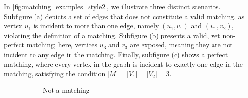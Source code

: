 \begin{example}
    In \cref{fig:matching_examples_style2}, we illustrate three distinct scenarios. Subfigure (a) depicts a set of edges that does not constitute a valid matching, as vertex $u_1$ is incident to more than one edge, namely $(u_1, v_1)$ and $(u_1, v_2)$, violating the definition of a matching. Subfigure (b) presents a valid, yet non-perfect matching; here, vertices $u_3$ and $v_3$ are exposed, meaning they are not incident to any edge in the matching. Finally, subfigure (c) shows a perfect matching, where every vertex in the graph is incident to exactly one edge in the matching, satisfying the condition $|M| = |V_1| = |V_2| = 3$.
    \begin{figure}[H]
        \centering
        \begin{subfigure}[b]{0.3\textwidth}
            \centering
            \caption{Not a matching}
            \label{fig:not_a_matching_style2}
        \end{subfigure}
        \hfill
        \begin{subfigure}[b]{0.3\textwidth}
            \centering
\end{subfigure}
\end{figure}
\end{example}
